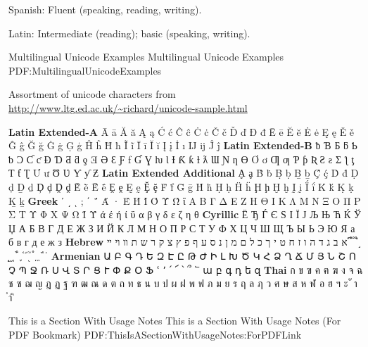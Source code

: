 \documentclass[letterpaper,MMMyyyy,nonstopmode]{simpleresumecv}
\begin{document}
\begin{Body}
{\Gap
\BulletItem
Spanish: Fluent (speaking, reading, writing).

\Gap
\BulletItem
Latin: Intermediate (reading); basic (speaking, writing).





\Section
{Multilingual Unicode Examples}
{Multilingual Unicode Examples}
{PDF:MultilingualUnicodeExamples}

\BulletItem
Assortment of unicode characters from
\href{http://www.ltg.ed.ac.uk/~richard/unicode-sample.html}
{\url{http://www.ltg.ed.ac.uk/~richard/unicode-sample.html}}

\begin{Detail}
\Item
\textbf{Latin Extended-A}
Ā ā Ă ă Ą ą Ć ć Ĉ ĉ Ċ ċ Č č Ď ď Đ đ Ē ē Ĕ ĕ Ė ė Ę ę Ě ě Ĝ ĝ Ğ ğ Ġ ġ Ģ ģ Ĥ ĥ Ħ ħ Ĩ ĩ Ī ī Ĭ ĭ Į į İ ı Ĳ ĳ Ĵ ĵ
\textbf{Latin Extended-B}
ƀ Ɓ Ƃ ƃ Ƅ ƅ Ɔ Ƈ ƈ Ɖ Ɗ Ƌ ƌ ƍ Ǝ Ə Ɛ Ƒ ƒ Ɠ Ɣ ƕ Ɩ Ɨ Ƙ ƙ ƚ ƛ Ɯ Ɲ ƞ Ɵ Ơ ơ Ƣ ƣ Ƥ ƥ Ʀ Ƨ ƨ Ʃ ƪ ƫ Ƭ ƭ Ʈ Ư ư Ʊ Ʋ Ƴ ƴ Ƶ
\textbf{Latin Extended Additional}
Ḁ ḁ Ḃ ḃ Ḅ ḅ Ḇ ḇ Ḉ ḉ Ḋ ḋ Ḍ ḍ Ḏ ḏ Ḑ ḑ Ḓ ḓ Ḕ ḕ Ḗ ḗ Ḙ ḙ Ḛ ḛ Ḝ ḝ Ḟ ḟ Ḡ ḡ Ḣ ḣ Ḥ ḥ Ḧ ḧ Ḩ ḩ Ḫ ḫ Ḭ ḭ Ḯ ḯ Ḱ ḱ Ḳ ḳ Ḵ ḵ
\textbf{Greek}
ʹ ͵ ͺ ; ΄ ΅ Ά · Έ Ή Ί Ό Ύ Ώ ΐ Α Β Γ Δ Ε Ζ Η Θ Ι Κ Λ Μ Ν Ξ Ο Π Ρ Σ Τ Υ Φ Χ Ψ Ω Ϊ Ϋ ά έ ή ί ΰ α β γ δ ε ζ η θ
\textbf{Cyrillic}
Ё Ђ Ѓ Є Ѕ І Ї Ј Љ Њ Ћ Ќ Ў Џ А Б В Г Д Е Ж З И Й К Л М Н О П Р С Т У Ф Х Ц Ч Ш Щ Ъ Ы Ь Э Ю Я а б в г д е ж з
\textbf{Hebrew}
א ב ג ד ה ו ז ח ט י ך כ ל ם מ ן נ ס ע ף פ ץ צ ק ר ש ת װ ױ ײ ֝ ֞ ֟ ֠ ֡ ֣ ֤ ֥ ֦ ֧ ֨ ֩ ֪ ֫ ֬ ֭ ֮ ֯ ְ ֱ ֒ ֓ ֔
\textbf{Armenian}
{\UseSecondaryFont
Ա Բ Գ Դ Ե Զ Է Ը Թ Ժ Ի Լ Խ Ծ Կ Հ Ձ Ղ Ճ Մ Յ Ն Շ Ո Չ Պ Ջ Ռ Ս Վ Տ Ր Ց Ւ Փ Ք Օ Ֆ ՙ ՚ ՛ ՜ ՝ ՞ ՟ ա բ գ դ ե զ}
\textbf{Thai}
{\UseSecondaryFont
ก ข ฃ ค ฅ ฆ ง จ ฉ ช ซ ฌ ญ ฎ ฏ ฐ ฑ ฒ ณ ด ต ถ ท ธ น บ ป ผ ฝ พ ฟ ภ ม ย ร ฤ ล ฦ ว ศ ษ ส ห ฬ อ ฮ ฯ ะ ั า ำ ิ}
\end{Detail}

\newpage


\begingroup
\color{red}

\Section
{This is a\newline
Section\newline
With\newline
Usage Notes}
{This is a Section With Usage Notes (For PDF Bookmark)}
{PDF:ThisIsASectionWithUsageNotes:ForPDFLink}

}
\end{Body}
\end{document}

